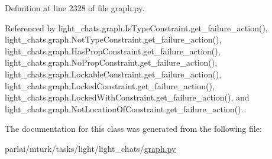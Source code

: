 Definition at line 2328 of file graph.\+py.



Referenced by light\+\_\+chats.\+graph.\+Is\+Type\+Constraint.\+get\+\_\+failure\+\_\+action(), light\+\_\+chats.\+graph.\+Not\+Type\+Constraint.\+get\+\_\+failure\+\_\+action(), light\+\_\+chats.\+graph.\+Has\+Prop\+Constraint.\+get\+\_\+failure\+\_\+action(), light\+\_\+chats.\+graph.\+No\+Prop\+Constraint.\+get\+\_\+failure\+\_\+action(), light\+\_\+chats.\+graph.\+Lockable\+Constraint.\+get\+\_\+failure\+\_\+action(), light\+\_\+chats.\+graph.\+Locked\+Constraint.\+get\+\_\+failure\+\_\+action(), light\+\_\+chats.\+graph.\+Locked\+With\+Constraint.\+get\+\_\+failure\+\_\+action(), and light\+\_\+chats.\+graph.\+Not\+Location\+Of\+Constraint.\+get\+\_\+failure\+\_\+action().



The documentation for this class was generated from the following file\+:\begin{DoxyCompactItemize}
\item 
parlai/mturk/tasks/light/light\+\_\+chats/\hyperlink{parlai_2mturk_2tasks_2light_2light__chats_2graph_8py}{graph.\+py}\end{DoxyCompactItemize}

